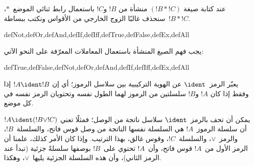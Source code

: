 \documentclass[../../../include/open-logic-section]{subfiles}
\begin{document}
عند كتابة صيغة $(!B \ast !C)$ منشأة من $!B$ و$!C$ باستعمال رابط
ثنائي الموضع~$\ast$، سنحذف غالبًا الزوج الخارجي من الأقواس ونكتب
ببساطة~$!B \ast !C$.

\begin{tagblock}{defNot,defOr,defAnd,defIf,defIff,defTrue,defFalse,defEx,defAll}
\begin{defn}
يجب فهم الصيغ المنشأة باستعمال المعاملات المعرّفة على النحو الآتي:

\begin{tagenumerate}{defTrue,defFalse,defNot,defOr,defAnd,defIf,defIff,defEx,defAll}







\end{tagenumerate}
\end{defn}
\end{tagblock}

\begin{defn}
يعبّر الرمز~$\ident$ عن الهوية التركيبية بين سلاسل الرموز؛ أي إن
$!A \ident !B$ إذا وفقط إذا كان $!A$ و$!B$ سلسلتين من الرموز لهما
الطول نفسه وتحتويان الرمز نفسه في كل موضع.
\end{defn}

يمكن أن تحف بالرمز~$\ident$ سلاسل ناتجة من الوصل؛ فمثلًا تعني
$!A \ident (!B \lor !C)$ أن سلسلة الرموز~$!A$ هي السلسلة نفسها الناتجة
من وصل قوس فاتح، والسلسلة~$!B$، والرمز~$\lor$، والسلسلة~$!C$، وقوس
غالق، بهذا الترتيب. وإذا كان الأمر كذلك، علمنا أن الرمز الأول من~$!A$
قوس فاتح، وأن~$!A$ تحتوي على~$!B$ بوصفها سلسلةً جزئية (تبدأ عند الرمز الثاني)،
وأن هذه السلسلة الجزئية يليها~$\lor$، وهكذا.
\end{document}
